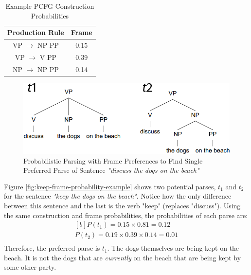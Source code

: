 \documentclass{article}
\begin{document}
\begin{table}[H]
	\centering
	\begin{tabular}{|c|c|}
		\hline
		\textbf{Production Rule} & \textbf{Frame} \\
		\hline
		VP $\rightarrow$ NP PP & 0.15 \\
		VP $\rightarrow$ V PP & 0.39 \\
		NP $\rightarrow$ NP PP & 0.14 \\
		\hline
	\end{tabular}
	\caption{Example PCFG Construction Probabilities}
	\label{tab:frame-example-construction-probabilities}
\end{table}

\begin{figure}[H]
	\centering
	\includegraphics[scale=0.45]{figures/discuss-frame-preference-example.png}
	\caption{Probabilistic Parsing with Frame Preferences to Find Single Preferred Parse of Sentence \textit{"discuss the dogs on the beach"}}
	\label{fig:discuss-frame-probability-example}
\end{figure}

Figure \ref{fig:keep-frame-probability-example} shows two potential parses, $t_1$ and $t_2$ for the sentence \textit{"keep the dogs on the beach"}. Notice how the only difference between this sentence and the last is the verb "keep" (replaces "discuss"). Using the same construction and frame probabilities, the probabilities of each parse are:
\begin{equation}
\begin{aligned}[b]
	P(t_1) = 0.15 \times 0.81 = 0.12 \\
	P(t_2) = 0.19 \times 0.39 \times 0.14 = 0.01 \\
\end{aligned}
\end{equation}
Therefore, the preferred parse is $t_1$. The dogs themselves are being kept on the beach. It is not the dogs that are \textit{currently} on the beach that are being kept by some other party.
\end{document}
